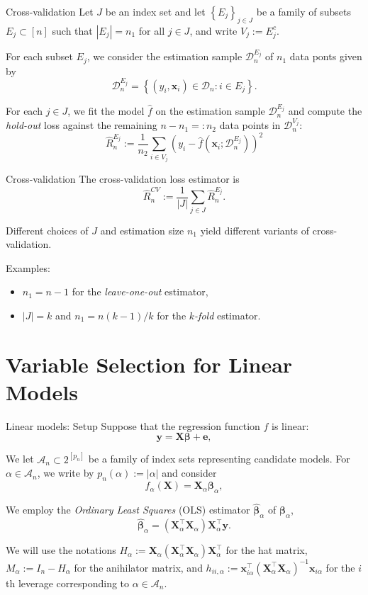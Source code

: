 \documentclass{beamer}
\newcommand{\0}{\emptyset}
\newcommand{\paren}[1]{\left(#1 \right)}
\newcommand{\set}[1]{\left\{ #1 \right\}}
\newcommand{\data}{\mathcal{D}_{n}}
\newcommand{\Acal}{\mathcal{A}_{n}}
\newcommand{\X}{\boldsymbol{X}}
\newcommand{\x}{\boldsymbol{x}}
\newcommand{\y}{\boldsymbol{y}}
\newcommand{\e}{\boldsymbol{e}}
\newcommand{\bbeta}{\boldsymbol{\beta}}
\newcommand{\bbetahat}{\boldsymbol{\hat{\beta}}}
\newcommand{\ols}[1]{\paren{\X^{\top}_{#1}\X_{#1}}\X^{\top}_{#1}\y}
\newcommand{\1}{\mathmybb{1}}
\begin{document}
\begin{frame}{Cross-validation}  
  Let \(J\) be an index set and let \(\set{E_{j}}_{j\in J}\) be a family of subsets \(E_{j}\subset [n]\) such that \(|E_{j}|=n_{1}\) for all \(j\in J\), and write \(V_{j} := E_{j}^{c}\). 
  
  For each subset \(E_{j}\), we consider the estimation sample \(\data^{E_{j}}\) of \(n_{1}\) data ponts given by
  \[\data^{E_{j}} = \set{\paren{y_{i}, \x_{i}}\in\data :i\in E_{j}}.\]

  For each \(j\in J\), we fit the model \(\hat{f}\) on the estimation sample \(\data^{E_{j}}\) and compute the \alert{\emph{hold-out}} loss against the remaining \(n-n_{1}=: n_{2}\) data points in \(\data^{V_{j}}\):
  \[\hat{R}_{n}^{E_{j}} := \frac{1}{n_{2}}\sum_{i \in V_{j}} \paren{y_{i} - \hat{f}\paren{\x_{i};\data^{E_{j}}}}^{2}\]
\end{frame}

\begin{frame}{Cross-validation}
  The cross-validation loss estimator is
  \[\hat{R}^{CV}_{n}:= \frac{1}{|J|}\sum_{j\in J}\hat{R}_{n}^{E_{j}}.\]

  Different choices of  \(J\) and estimation size \(n_{1}\) yield different variants of cross-validation.
  
  Examples:
  \begin{itemize}
    \item \(n_{1}=n-1\) for the \emph{leave-one-out} estimator,
    \item \(|J|=k\) and \(n_{1} = n(k-1)/k\) for the \emph{\(k\)-fold} estimator.
  \end{itemize}

\end{frame}

\section{Variable Selection for Linear Models}\label{sec:lm}
\begin{frame}{Linear models: Setup}
  Suppose that the regression function \(f\) is \alert{linear}:
  \[\y = \X\bbeta + \e,\]

  We let \(\Acal\subset2^{[p_{n}]}\) be a family of index sets representing candidate models. For \(\alpha\in\Acal\), we write by \(p_{n}(\alpha) := |\alpha|\) and consider
  \[f_{\alpha}(\X) = \X_{\alpha}\bbeta_{\alpha},\]

  We employ the \emph{Ordinary Least Squares} (OLS) estimator \(\bbetahat_{\alpha}\) of \(\bbeta_{\alpha}\),
  \[\bbetahat_{\alpha} = \ols{\alpha}.\]

  We will use the notations \alert{\(H_{\alpha} := \X_{\alpha}\paren{\X_{\alpha}^{\top}\X_{\alpha}}\X_{\alpha}^{\top}\)} for the hat matrix, \alert{\(M_{\alpha}:=I_{n}-H_{\alpha}\)} for the anihilator matrix, and \alert{\(h_{ii,\alpha}:=\x_{i\alpha}^{\top}{(\X_{\alpha}^{\top}\X_{\alpha})}^{-1}\x_{i\alpha}\)} for the \(i\)th leverage corresponding to \(\alpha\in\Acal\).
\end{frame}
\end{document}
